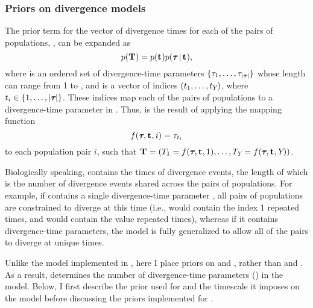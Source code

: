 \subsubsection{Priors on divergence models}
\begin{linenomath}
The prior term for the vector of divergence times for each of the \npairs{}
pairs of populations, \divTimeMapVector, can be expanded as
\begin{equation}
    p(\mathbf{T_{}}) = p(\mathbf{t_{}})p(\boldsymbol{\tau_{}} \,|\, \mathbf{t_{}}),
    \label{eq:divModelPrior}
\end{equation}
where \divTimeVector is an ordered set of divergence-time parameters
$\{\tau_{1}, \ldots, \tau_{\lvert \boldsymbol{\tau_{}} \rvert}\}$ whose length
\divTimeNum can range from 1 to \npairs{},
and \divTimeIndexVector is a vector of indices %
$(t_{1}, \ldots, t_{Y_{}})$,
where
$t_{i} \in \{1, \ldots, \lvert \boldsymbol{\tau_{}} \rvert\}$.
These indices map each of the \npairs{} pairs of populations to a
divergence-time parameter in \divTimeVector.
Thus, \divTimeMapVector is the result of applying the mapping function
\begin{equation}
    f(\boldsymbol{\tau_{}}, \mathbf{t_{}}, i) = \tau_{t_{i}}
    \label{eq:divTimeMapFunction}
\end{equation}
to each population pair $i$, such that
$\mathbf{T_{}} = (T_{1} = f(\boldsymbol{\tau_{}}, \mathbf{t_{}},
1), \ldots, T_{Y_{}} = f(\boldsymbol{\tau_{}}, \mathbf{t_{}},
Y_{}))$.
\end{linenomath}

Biologically speaking, \divTimeVector contains the times of divergence events,
the length of which \divTimeNum is the number of divergence events shared across
the \npairs{} pairs of populations.
For example, if \divTimeVector contains a single divergence-time parameter
, all \npairs{} pairs of populations are constrained to diverge at
this time (i.e., \divTimeIndexVector would contain the index 1 repeated
\npairs{} times, and \divTimeMapVector would contain the value 
repeated \npairs{} times), whereas if it contains \npairs{} divergence-time
parameters, the model is fully generalized to allow all of the pairs to diverge
at unique times.

Unlike the model implemented in \msb, here I place priors on
\divTimeIndexVector and \divTime{}, rather than \divTimeNum and
\divTime{}.
As a result, \divTimeIndexVector determines the number of divergence-time
parameters (\divTimeNum) in the model.
Below, I first describe the prior used for \divTime{} and the timescale it
imposes on the model before discussing the priors implemented for
\divTimeIndexVector.

